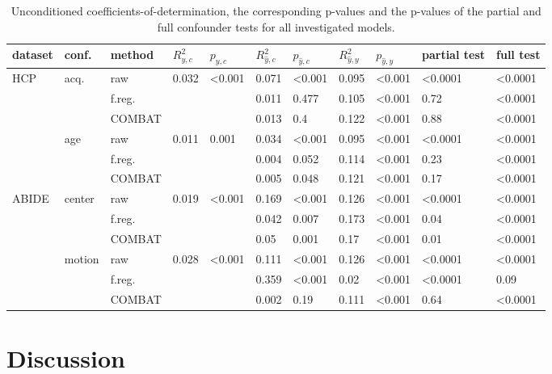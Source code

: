 \documentclass{article}
\begin{document}
\renewcommand{\arraystretch}{1.2}
\begin{table}
\centering
\begin{tabular}{lll|ll|ll|ll|ll} 
dataset & conf. & method & $R^2_{y, c}$ & $p_{y, c}$ & $R^2_{\hat{y}, c}$ & $p_{\hat{y}, c}$ & $R^2_{\hat{y}, y}$ & $p_{\hat{y}, y}$ & partial test & full test  \\
\hline
HCP & acq.  & raw      & 0.032 & <0.001 & 0.071 & <0.001  & 0.095 & <0.001 & <0.0001 & <0.0001 \\
    &              & f.reg.    & & & 0.011 & 0.477 & 0.105  & <0.001  & 0.72 & <0.0001 \\
    &              & COMBAT    & & &0.013 & 0.4 & 0.122  & <0.001  & 0.88 & <0.0001\\
\hline
    & age   & raw       & 0.011 & 0.001  & 0.034 & <0.001  & 0.095  & <0.001 & <0.0001 & <0.0001 \\
    &       & f.reg.    & & &0.004 & 0.052 & 0.114  & <0.001  & 0.23 & <0.0001 \\
    &       & COMBAT    & & &0.005 & 0.048 & 0.121 & <0.001 & 0.17 & <0.0001 \\
\hline
ABIDE   & center   & raw       & 0.019  & <0.001 &  0.169 & <0.001& 0.126     & <0.001 & <0.0001 & <0.0001 \\
        &          & f.reg.    &  & &  0.042 & 0.007 & 0.173     & <0.001 & 0.04 & <0.0001 \\
        &          & COMBAT    &  & &  0.05 & 0.001 & 0.17     & <0.001 & 0.01 & <0.0001 \\
\hline
        & motion   & raw       & 0.028 & <0.001 & 0.111    &  <0.001 & 0.126    & <0.001 & <0.0001& <0.0001 \\
        &          & f.reg.    & & & 0.359    & <0.001  & 0.02   & <0.001 & <0.0001 & 0.09 \\
        &          & COMBAT    & & &  0.002 & 0.19 & 0.111     & <0.001 & 0.64 & <0.0001 \\
    

\end{tabular}
\caption{\label{tab:unconditional-pvals} Unconditioned coefficients-of-determination, the corresponding p-values and the p-values of the partial and full confounder tests for all investigated models.}
\end{table}

\section{Discussion}
\end{document}
